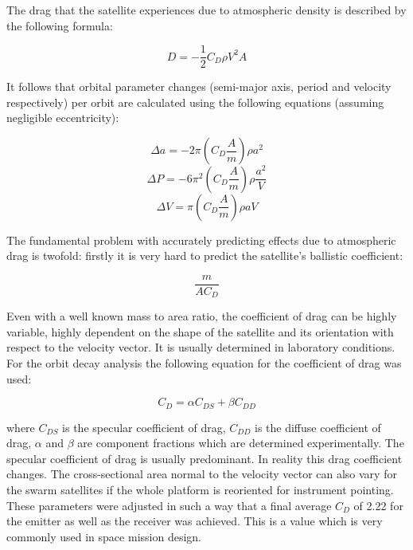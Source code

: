 The drag that the satellite experiences due to atmospheric density is described by the following formula:

\begin{equation}
D = -\frac{1}{2} C_D \rho V^2A
\label{drag}
\end{equation}

It follows that orbital parameter changes (semi-major axis, period and velocity respectively) per orbit are calculated using the following equations (assuming negligible eccentricity):

\begin{equation}
\Delta a = -2 \pi \left( C_D \frac{A}{m} \right) \rho a^2
\label{deltaSMA}
\end{equation}
\begin{equation}
\Delta P = -6 \pi^2 \left( C_D \frac{A}{m} \right) \rho \frac{a^2}{V}
\label{deltaP}
\end{equation}
\begin{equation}
\Delta V = \pi \left( C_D \frac{A}{m} \right) \rho aV
\label{deltaV}
\end{equation}

The fundamental problem with accurately predicting effects due to atmospheric drag is twofold: firstly it is very hard to predict the satellite's ballistic coefficient:

\begin{equation}
\frac{m}{AC_D}
\label{ball}
\end{equation}

Even with a well known mass to area ratio, the coefficient of drag can be highly variable, highly dependent on the shape of the satellite and its orientation with respect to the velocity vector. It is usually determined in laboratory conditions. For the orbit decay analysis the following equation for the coefficient of drag was used:

\begin{equation}
C_D = \alpha C_{DS} + \beta C_{DD}
\label{cd}
\end{equation}

where $C_{DS}$ is the specular coefficient of drag, $C_{DD}$ is the diffuse coefficient of drag, $\alpha$ and $\beta$ are component fractions which are determined experimentally. The specular coefficient of drag is usually predominant. In reality this drag coefficient changes. The cross-sectional area normal to the velocity vector can also vary for the swarm satellites if the whole platform is reoriented for instrument pointing. These parameters were adjusted in such a way that a final average $C_D$ of 2.22 for the emitter as well as the receiver was achieved. This is a value which is very commonly used in space mission design.

